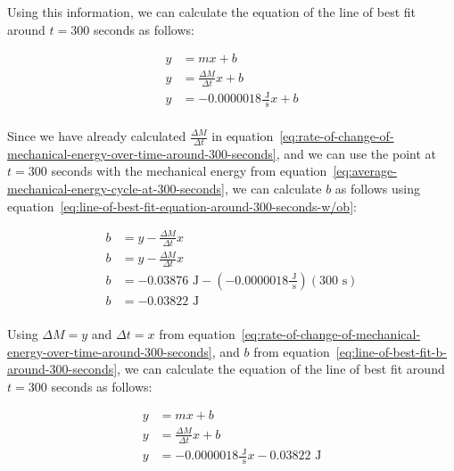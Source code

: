 \documentclass{article}
\begin{document}
            Using this information, we can calculate the equation of the line of best fit around $t=300$ seconds as follows:
            
            \begin{equation}
                \begin{aligned}
                    y &= mx + b \\
                    y &= \frac{\Delta M}{\Delta t}x + b \\
                    y &= -0.0000018 \frac{\text{ J}}{\text{ s}}x + b \\
                \end{aligned}\label{eq:line-of-best-fit-equation-around-300-seconds-w/ob}
            \end{equation}
            
            Since we have already calculated $\frac{\Delta M}{\Delta t}$ in equation~\ref{eq:rate-of-change-of-mechanical-energy-over-time-around-300-seconds}, and we can use the point at $t = 300$ seconds with the mechanical energy from equation~\ref{eq:average-mechanical-energy-cycle-at-300-seconds}, we can calculate $b$ as follows using equation~\ref{eq:line-of-best-fit-equation-around-300-seconds-w/ob}:
            
            \begin{equation}
                \begin{aligned}
                    b &= y - \frac{\Delta M}{\Delta t}x \\
                    b &= y - \frac{\Delta M}{\Delta t}x \\
                    b &= -0.03876 \text{ J} - (-0.0000018 \frac{\text{ J}}{\text{ s}})(300 \text{ s}) \\
                    b &= -0.03822 \text{ J} \\
                \end{aligned}\label{eq:line-of-best-fit-b-around-300-seconds}
            \end{equation}
            
            Using $\Delta M = y$ and $\Delta t = x$ from equation~\ref{eq:rate-of-change-of-mechanical-energy-over-time-around-300-seconds}, and $b$ from equation~\ref{eq:line-of-best-fit-b-around-300-seconds}, we can calculate the equation of the line of best fit around $t=300$ seconds as follows:
            
            \begin{equation}
                \begin{aligned}
                    y &= mx + b \\
                    y &= \frac{\Delta M}{\Delta t}x + b \\
                    y &= -0.0000018 \frac{\text{ J}}{\text{ s}}x - 0.03822 \text{ J} \\
                \end{aligned}\label{eq:line-of-best-fit-equation-around-300-seconds}
            \end{equation}
            
\end{document}
